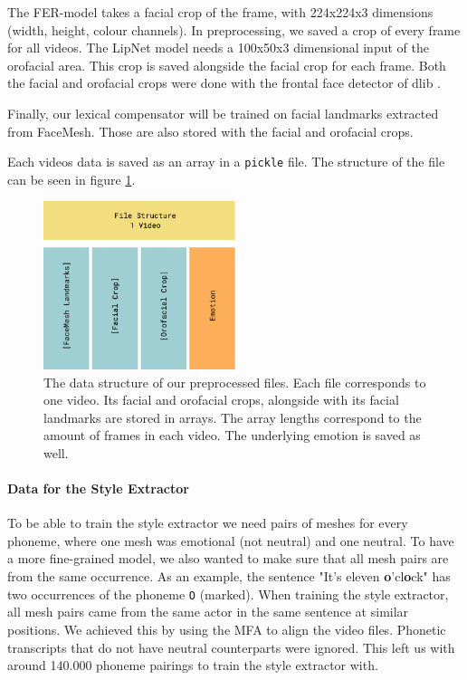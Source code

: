 The FER-model takes a facial crop of the frame, with 224x224x3 dimensions (width, height, colour channels). In preprocessing, we saved a crop of every frame for all videos. 
The LipNet model needs a 100x50x3 dimensional input of the orofacial area. This crop is saved alongside the facial crop for each frame. Both the facial and orofacial crops were done with the frontal face detector of dlib \cite{dlib09}.

Finally, our lexical compensator will be trained on facial landmarks extracted from FaceMesh. Those are also stored with the facial and orofacial crops.

Each videos data is saved as an array in a \texttt{pickle} file. The structure of the file can be seen in figure \ref{fig:pickle}.
\begin{figure}
    \centering
    \includegraphics[width=0.5\textwidth]{res/Pickle.pdf}
    \caption{The data structure of our preprocessed files. Each file corresponds to one video. Its facial and orofacial crops, alongside with its facial landmarks are stored in arrays. The array lengths correspond to the amount of frames in each video. The underlying emotion is saved as well.}
    \label{fig:pickle}
\end{figure}

\paragraph{Data for the Style Extractor}
To be able to train the style extractor we need pairs of meshes for every phoneme, where one mesh was emotional (not neutral) and one neutral. To have a more fine-grained model, we also wanted to make sure that all mesh pairs are from the same occurrence. As an example, the sentence "It's eleven \textbf{o}'cl\textbf{o}ck" has two occurrences of the phoneme \texttt{O} (marked). When training the style extractor, all mesh pairs came from the same actor in the same sentence at similar positions. We achieved this by using the MFA to align the video files. Phonetic transcripts that do not have neutral counterparts were ignored. This left us with around 140.000 phoneme pairings to train the style extractor with. 


